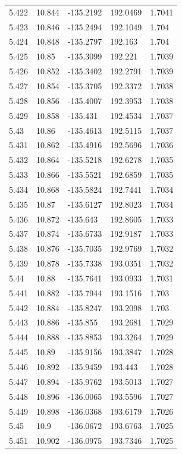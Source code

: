 \begin{tabular}{lllll}
5.422 & 10.844 & -135.2192 & 192.0469 & 1.7041 \\
5.423 & 10.846 & -135.2494 & 192.1049 & 1.704 \\
5.424 & 10.848 & -135.2797 & 192.163 & 1.704 \\
5.425 & 10.85 & -135.3099 & 192.221 & 1.7039 \\
5.426 & 10.852 & -135.3402 & 192.2791 & 1.7039 \\
5.427 & 10.854 & -135.3705 & 192.3372 & 1.7038 \\
5.428 & 10.856 & -135.4007 & 192.3953 & 1.7038 \\
5.429 & 10.858 & -135.431 & 192.4534 & 1.7037 \\
5.43 & 10.86 & -135.4613 & 192.5115 & 1.7037 \\
5.431 & 10.862 & -135.4916 & 192.5696 & 1.7036 \\
5.432 & 10.864 & -135.5218 & 192.6278 & 1.7035 \\
5.433 & 10.866 & -135.5521 & 192.6859 & 1.7035 \\
5.434 & 10.868 & -135.5824 & 192.7441 & 1.7034 \\
5.435 & 10.87 & -135.6127 & 192.8023 & 1.7034 \\
5.436 & 10.872 & -135.643 & 192.8605 & 1.7033 \\
5.437 & 10.874 & -135.6733 & 192.9187 & 1.7033 \\
5.438 & 10.876 & -135.7035 & 192.9769 & 1.7032 \\
5.439 & 10.878 & -135.7338 & 193.0351 & 1.7032 \\
5.44 & 10.88 & -135.7641 & 193.0933 & 1.7031 \\
5.441 & 10.882 & -135.7944 & 193.1516 & 1.703 \\
5.442 & 10.884 & -135.8247 & 193.2098 & 1.703 \\
5.443 & 10.886 & -135.855 & 193.2681 & 1.7029 \\
5.444 & 10.888 & -135.8853 & 193.3264 & 1.7029 \\
5.445 & 10.89 & -135.9156 & 193.3847 & 1.7028 \\
5.446 & 10.892 & -135.9459 & 193.443 & 1.7028 \\
5.447 & 10.894 & -135.9762 & 193.5013 & 1.7027 \\
5.448 & 10.896 & -136.0065 & 193.5596 & 1.7027 \\
5.449 & 10.898 & -136.0368 & 193.6179 & 1.7026 \\
5.45 & 10.9 & -136.0672 & 193.6763 & 1.7025 \\
5.451 & 10.902 & -136.0975 & 193.7346 & 1.7025 \\

\end{tabular}

